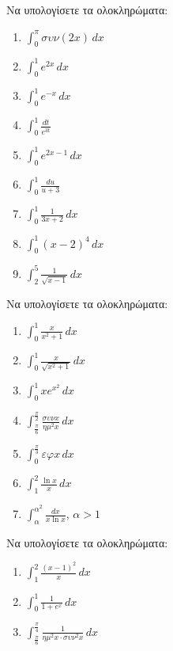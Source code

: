 \documentclass{../presentation}
\begin{document}
\begin{askisi}
  Να υπολογίσετε τα ολοκληρώματα:
  \begin{enumerate}[<+->]
    \item $\int_{0}^{π}συν(2x)\,dx$
    \item $\int_{0}^{1}e^{2x}\,dx$
    \item $\int_{0}^{1}e^{-x}\,dx$
    \item $\int_{0}^{1}\frac{dt}{e^{3t}}$
    \item $\int_{0}^{1}e^{2x-1}\,dx$
    \item $\int_{0}^{1}\frac{du}{u+3}$
    \item $\int_{0}^{1}\frac{1}{3x+2}\,dx$
    \item $\int_{0}^{1}(x-2)^4\,dx$
    \item $\int_{2}^{5}\frac{1}{\sqrt{x-1}}\,dx$
  \end{enumerate}
\end{askisi}

\begin{askisi}
  Να υπολογίσετε τα ολοκληρώματα:
  \begin{enumerate}[<+->]
    \item $\int_{0}^{1}\frac{x}{x^2+1}\,dx$
    \item $\int_{0}^{1}\frac{x}{\sqrt{x^2+1}}\,dx$
    \item $\int_{0}^{1}xe^{x^2}\,dx$
    \item $\int_{\frac{π}{6}}^{\frac{π}{2}}\frac{συνx}{ημ^2x}\, dx$
    \item $\int_{0}^{\frac{π}{3}}εφx\,dx$
    \item $\int_{1}^{2}\frac{\ln x}{x}\, dx$
    \item $\int_{α}^{α^2}\frac{dx}{x\ln x}$, $α>1$
  \end{enumerate}
\end{askisi}

\begin{askisi}
  Να υπολογίσετε τα ολοκληρώματα:
  \begin{enumerate}[<+->]
    \item $\int_{1}^{2}\frac{(x-1)^2}{x}\, dx$
    \item $\int_{0}^{1}\frac{1}{1+e^x}\, dx$
    \item $\int_{\frac{π}{6}}^{\frac{π}{4}}\frac{1}{ημ^2x\cdot συν^2x}\, dx$
  \end{enumerate}
\end{askisi}
\end{document}
